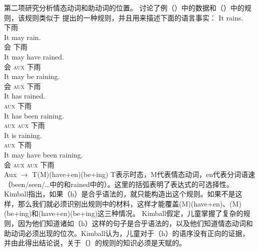 第二项研究分析情态动词和助动词的位置。 \citet[--75]{Kimball73b-u}讨论了例（）中的数据和（）中的规则，该规则类似于 \citet[]{Chomsky57a}提出的一种规则，并且用来描述下面的语言事实：
\eal
\label{Aux-Beispiele}
\ex 
\gll It rains.\\
     \expl{} 下雨\\
\ex\label{It-may-rain} 
\gll It may rain.\\
     \expl{} 会 下雨\\
\ex 
\gll It may have rained.\\
     \expl{} 会 \textsc{aux} 下雨\\
\ex 
\gll It may be raining.\\
     \expl{} 会 \textsc{aux} 下雨\\
\ex 
\gll It has rained.\\
     \expl{} \textsc{aux} 下雨\\
\ex 
\gll It has been raining.\\
     \expl{} \textsc{aux} \textsc{aux} 下雨\\
\ex 
\gll It is raining.\\
     \expl{} \textsc{aux} 下雨\\
\ex\label{It-may-have-been-raining} 
\gll It may have been raining.\\
     \expl{} 会 \textsc{aux} \textsc{aux} 下雨\\
\zl
\ea
\label{Regel-Aux}
Aux $\to$ T(M)(have+en)(be+ing)
\z
T表示时态，M代表情态动词，en代表分词语速（been/seen/\ldots{}中的和rained中的）。这里的括弧表明了表达式的可选择性。Kimball指出，如果（h）是合乎语法的，就只能构造出这个规则。如果不是这样，那么我们就必须识别出规则中的材料，这样才能覆盖(M)(have+en)、(M)(be+ing)和(have+en)(be+ing)这三种情况。
Kimball假定，儿童掌握了复杂的规则，因为他们知道诸如（h）这样的句子是合乎语法的，以及他们知道情态动词和助动词必须出现的位次。Kimball认为，儿童对于（h）的语序没有正向的证据，并由此得出结论说，关于（）的规则的知识必须是天赋的。
